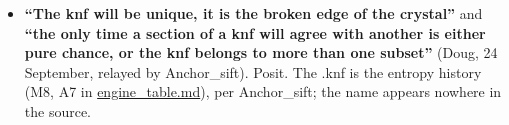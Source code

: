 \begin{itemize}
\begin{itemize}
\begin{itemize}
\item 8,192 of 8,192 null draws change the crystal exactly when they move a value: T(σx) = T(x) exactly when σx = x. \textbf{Measured:} 0 draws moved none.
\item Every single flipped bit changes the image: 8,192 of 8,192 pairs through T and 8,192 of 8,192 through T⁻¹.
\item Derived: both follow from T being a bijection. The crystal is a one-to-one ID of its samples. The heap fingerprint is many-to-one: it reads the arrangement's structure, not the samples.
\end{itemize}
\end{itemize}
\item \textbf{“The knf will be unique, it is the broken edge of the crystal”} and \textbf{“the only time a section of a knf will agree with another is either pure chance, or the knf belongs to more than one subset”} (Doug, 24 September, relayed by Anchor\_\allowbreak{}sift). Posit. The .knf is the entropy history (M8, A7 in \hyperref[chap:engine-table]{engine\_\allowbreak{}table.md}), per Anchor\_\allowbreak{}sift; the name appears nowhere in the source.


\end{itemize}
